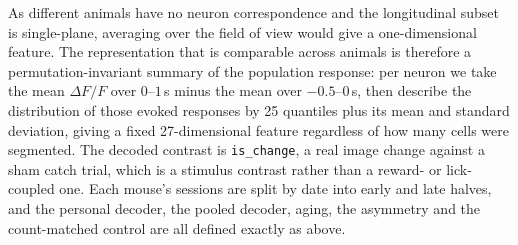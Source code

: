 \documentclass[mlabstract,onecolumn]{jmlr}
\begin{document}
As different animals have no neuron correspondence and the longitudinal subset is single-plane,
averaging over the field of view would give a one-dimensional feature. The representation that is
comparable across animals is
therefore a permutation-invariant summary of the population response: per neuron we take the mean
$\Delta F/F$ over $0$--$1$\,s minus the mean over $-0.5$--$0$\,s, then describe the distribution of
those evoked responses by 25 quantiles plus its mean and standard deviation, giving a fixed
27-dimensional feature regardless of how many cells were segmented. The decoded contrast is
\texttt{is\_change}, a real image change against a sham catch trial, which is a stimulus contrast
rather than a reward- or lick-coupled one. Each mouse's sessions are split by date into early and
late halves, and the personal decoder, the pooled decoder, aging, the asymmetry and the
count-matched control are all defined exactly as above.
\end{document}

